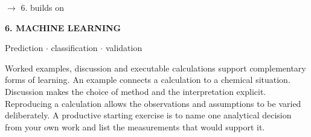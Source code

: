 \documentclass[11pt,a4paper]{article}
\begin{document}
\par\noindent $\longrightarrow$ 6. builds on
\par\medskip\noindent\textcolor{pcd1}{\textbf{6. MACHINE LEARNING}}\par
Prediction \ensuremath{\cdot} classification \ensuremath{\cdot} validation


\medskip

Worked examples, discussion and executable calculations support complementary forms of learning. An example connects a calculation to a chemical situation. Discussion makes the choice of method and the interpretation explicit. Reproducing a calculation allows the observations and assumptions to be varied deliberately. A productive starting exercise is to name one analytical decision from your own work and list the measurements that would support it.
\end{document}

